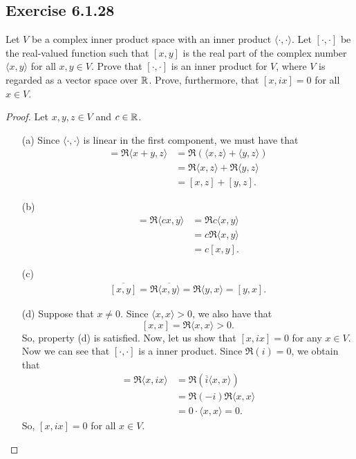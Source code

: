 \subsection*{Exercise 6.1.28} Let \( V  \) be a complex inner product space with an inner product \( \langle \cdot ,  \cdot \rangle \). Let \( [\cdot, \cdot] \) be the real-valued function such that \( [x,y] \) is the real part of the complex number \( \langle x , y \rangle \) for all \( x,y \in V  \). Prove that \( [\cdot, \cdot] \) is an inner product for \( V  \), where \( V  \) is regarded as a vector space over \( \mathbb{R}  \). Prove, furthermore, that \( [x,ix] = 0  \) for all \( x \in V  \).
\begin{proof}
Let \( x,y,z \in V  \) and \( c \in \mathbb{R}   \). 
\begin{enumerate}
    \item[(a)] Since \( \langle  \cdot  ,  \cdot \rangle \) is linear in the first component, we must have that
        \begin{align*}
            [x + y, z] = \Re \langle x + y , z  \rangle &= \Re (\langle x  , z \rangle + \langle y  , z \rangle) \\
                                                        &= \Re \langle x , z \rangle + \Re \langle y , z \rangle \\
                                                        &= [x,z] + [y,z].
        \end{align*}
    \item[(b)]
        \begin{align*}
            [cx, y] = \Re \langle cx , y \rangle &= \Re c \langle x , y \rangle  \\
                                                 &=  c \Re \langle x , y \rangle \\
                                                 &= c [x,y].
        \end{align*}
    \item[(c)] 
        \begin{align*}
            \overline{[x,y]} = \Re \overline{\langle x , y \rangle} = \Re \langle y , x \rangle  = [y,x].
        \end{align*}
    \item[(d)] Suppose that \( x \neq 0  \). Since \( \langle x , x \rangle > 0  \), we also have that
        \[  [x,x] = \Re \langle x , x \rangle > 0.  \]
        So, property (d) is satisfied. Now, let us show that \( [x,ix] = 0  \) for any \( x \in V  \). Now we can see that \( [ \cdot , \cdot ] \) is a inner product. Since \( \Re(i) = 0  \), we obtain that
        \begin{align*}
            [x,ix] = \Re \langle x , ix \rangle &= \Re (\overline{i} \langle x , x \rangle)\\
                   &= \Re(-i) \Re \langle x , x \rangle \\
                   &= 0 \cdot \langle x , x \rangle = 0.
        \end{align*}
        So, \( [x,ix] = 0  \) for all \( x \in V  \).
\end{enumerate}
\end{proof}

